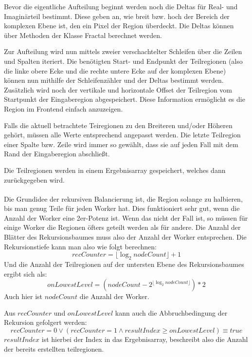 Bevor die eigentliche Aufteilung beginnt werden noch die Deltas für Real- und Imaginärteil bestimmt.
Diese geben an, wie breit bzw. hoch der Bereich der komplexen Ebene ist, den ein Pixel der Region überdeckt.
Die Deltas können über Methoden der Klasse Fractal berechnet werden.

Zur Aufteilung wird nun mittels zweier verschachtelter Schleifen über die Zeilen und Spalten iteriert.
Die benötigten Start- und Endpunkt der Teilregionen (also die linke obere Ecke und die rechte untere Ecke auf der komplexen Ebene) können nun mithilfe der Schleifenzähler und der Deltas bestimmt werden.
Zusätzlich wird noch der vertikale und horizontale Offset der Teilregion vom Startpunkt der Eingaberegion abgespeichert. Diese Information ermöglicht es die Region im Frontend einfach anzuzeigen.

Falls die aktuell betrachtete Teiregionen zu den Breiteren und/oder Höheren gehört, müssen alle Werte entsprechend angepasst werden.
Die letzte Teilregion einer Spalte bzw. Zeile wird immer so gewählt, dass sie auf jeden Fall mit dem Rand der Eingaberegion abschließt.

Die Teilregionen werden in einem Ergebnisarray gespeichert, welches dann zurückgegeben wird.

\paragraph*{}
Die Grundidee der rekursiven Balancierung ist, die Region solange zu halbieren, bis man genug Teile für jeden Worker hat.
Dies funktioniert sehr gut, wenn die Anzahl der Worker eine 2er-Potenz ist. Wenn das nicht der Fall ist, so müssen für einige Worker die Regionen öfters geteilt werden als für andere.
Die Anzahl der Blätter des Rekursionsbaumes muss also der Anzahl der Worker entsprechen.
Die Rekursionstiefe kann man also wie folgt berechnen:
\begin{equation*}
	recCounter = \lfloor\log_2 nodeCount\rfloor + 1
\end{equation*}
Und die Anzahl der Teilregionen auf der untersten Ebene des Rekursionsbaumes ergibt sich als:
\begin{equation*}
	onLowestLevel = (nodeCount - 2^{\lfloor\log_2 nodeCount\rfloor}) * 2
\end{equation*}
Auch hier ist $nodeCount$ die Anzahl der Worker.

Aus $recCounter$ und $onLowestLevel$ kann auch die Abbruchbedingung der Rekursion gefolgert werden:
\begin{equation} \label{lastbalancierung_rekursion_abbruch}
	recCounter = 0 \vee (recCounter = 1 \wedge resultIndex \geq onLowestLevel) \equiv true
\end{equation}
$resultIndex$ ist hierbei der Index in das Ergebnisarray, beschreibt also die Anzahl der bereits erstellten teilregionen.

